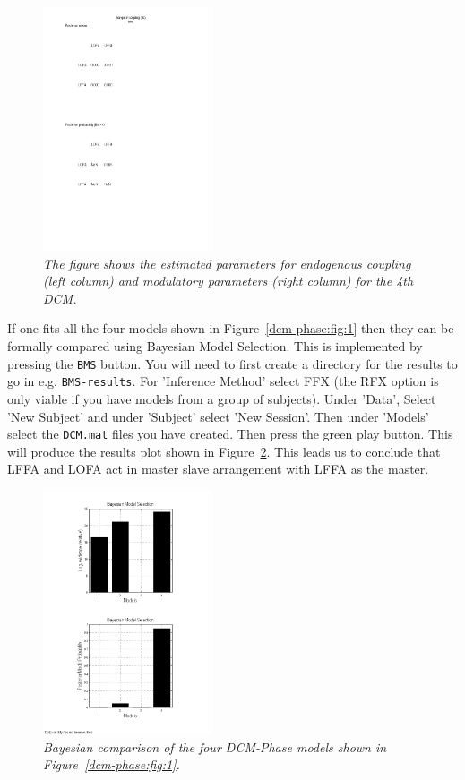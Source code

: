 \begin{figure}
\begin{center}
\includegraphics[width=50mm]{dcm_phase/figures/modulatory}
\caption{\em The figure shows the estimated parameters for endogenous coupling (left column) and modulatory parameters (right column) for the 4th DCM.  \label{dcm-phase:fig:3}}
\end{center}
\end{figure}

If one fits all the four models shown in Figure~\ref{dcm-phase:fig:1} then they can be formally compared using Bayesian Model Selection. This is implemented by pressing the \texttt{BMS} button. You will need to first create a directory for the results to go in e.g. \texttt{BMS-results}. For 'Inference Method' select FFX (the RFX option is only viable if you have models from a group of subjects). Under 'Data', Select 'New Subject' and under 'Subject' select 'New Session'. Then under 'Models' select the \texttt{DCM.mat} files you have created.  Then press the green play button. This will produce the results plot shown in Figure~\ref{dcm-phase:fig:4}. This leads us to conclude that 
LFFA and LOFA act in master slave arrangement with LFFA as the master.

\begin{figure}
\begin{center}
\includegraphics[width=50mm]{dcm_phase/figures/bms_phase}
\caption{\em Bayesian comparison of the four DCM-Phase models shown in Figure~\ref{dcm-phase:fig:1}.\label{dcm-phase:fig:4}}
\end{center}
\end{figure}

